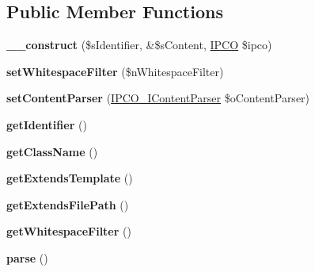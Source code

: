 \subsection*{Public Member Functions}
\begin{DoxyCompactItemize}
\item 
\hypertarget{class_i_p_c_o___parser_a09d1146f3152fb98144d268bb745bf75}{{\bfseries \-\_\-\-\_\-construct} (\$s\-Identifier, \&\$s\-Content, \hyperlink{class_i_p_c_o}{I\-P\-C\-O} \$ipco)}\label{class_i_p_c_o___parser_a09d1146f3152fb98144d268bb745bf75}

\item 
\hypertarget{class_i_p_c_o___parser_a93b2087b2f1cb9622c00fc8317e7532f}{{\bfseries set\-Whitespace\-Filter} (\$n\-Whitespace\-Filter)}\label{class_i_p_c_o___parser_a93b2087b2f1cb9622c00fc8317e7532f}

\item 
\hypertarget{class_i_p_c_o___parser_a7a03131e9f49f6b525808f46745bb8d0}{{\bfseries set\-Content\-Parser} (\hyperlink{interface_i_p_c_o___i_content_parser}{I\-P\-C\-O\-\_\-\-I\-Content\-Parser} \$o\-Content\-Parser)}\label{class_i_p_c_o___parser_a7a03131e9f49f6b525808f46745bb8d0}

\item 
\hypertarget{class_i_p_c_o___parser_a515a00b102f2b0d9156ee0146c973191}{{\bfseries get\-Identifier} ()}\label{class_i_p_c_o___parser_a515a00b102f2b0d9156ee0146c973191}

\item 
\hypertarget{class_i_p_c_o___parser_abf7cffe3dc8475dbdaffee85244d210c}{{\bfseries get\-Class\-Name} ()}\label{class_i_p_c_o___parser_abf7cffe3dc8475dbdaffee85244d210c}

\item 
\hypertarget{class_i_p_c_o___parser_ab1cb12f9aa15125a46cc6276aa631fc3}{{\bfseries get\-Extends\-Template} ()}\label{class_i_p_c_o___parser_ab1cb12f9aa15125a46cc6276aa631fc3}

\item 
\hypertarget{class_i_p_c_o___parser_a41721f547374bfa252c3ee3a58cfe3a0}{{\bfseries get\-Extends\-File\-Path} ()}\label{class_i_p_c_o___parser_a41721f547374bfa252c3ee3a58cfe3a0}

\item 
\hypertarget{class_i_p_c_o___parser_ac521230b898ab3614e4c552b9d608677}{{\bfseries get\-Whitespace\-Filter} ()}\label{class_i_p_c_o___parser_ac521230b898ab3614e4c552b9d608677}

\item 
\hypertarget{class_i_p_c_o___parser_a4f0c81b8dddf3d4b02fd1e4f320c152b}{{\bfseries parse} ()}\label{class_i_p_c_o___parser_a4f0c81b8dddf3d4b02fd1e4f320c152b}


\end{DoxyCompactItemize}
